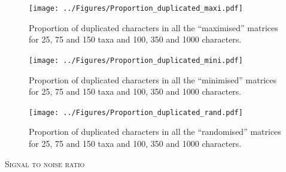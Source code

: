 \documentclass[12pt,letterpaper]{article}
\renewcommand{\section}[1]{%
\bigskip
\begin{center}
\begin{Large}
\normalfont\scshape #1
\medskip
\end{Large}
\end{center}}
\begin{document}
\begin{figure}[!htbp]
\centering
   \texttt{[image: ../Figures/Proportion\_duplicated\_maxi.pdf]}
\caption{Proportion of duplicated characters in all the ``maximised'' matrices for 25, 75 and 150 taxa and 100, 350 and 1000 characters.}
\end{figure}

\begin{figure}[!htbp]
\centering
   \texttt{[image: ../Figures/Proportion\_duplicated\_mini.pdf]}
\caption{Proportion of duplicated characters in all the ``minimised'' matrices for 25, 75 and 150 taxa and 100, 350 and 1000 characters.}
\end{figure}

\begin{figure}[!htbp]
\centering
   \texttt{[image: ../Figures/Proportion\_duplicated\_rand.pdf]}
\caption{Proportion of duplicated characters in all the ``randomised'' matrices for 25, 75 and 150 taxa and 100, 350 and 1000 characters.}
\end{figure}





\newpage

\section{Signal to noise ratio}
\end{document}
